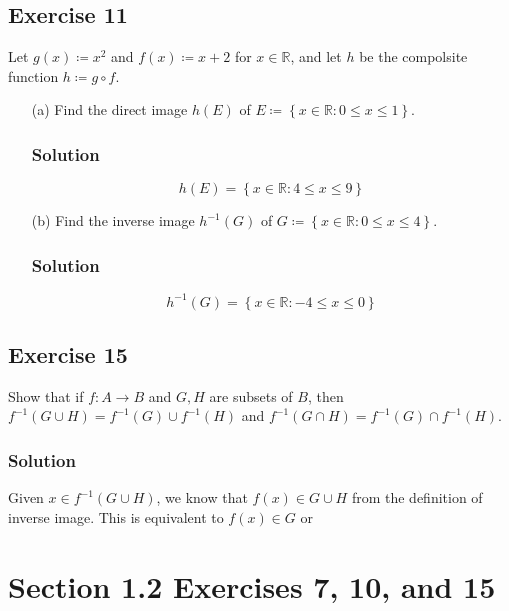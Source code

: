 \documentclass[12pt]{article}
\begin{document}
\subsection*{Exercise 11}
Let $g\left(x\right) \coloneqq x^2$  and $f\left(x\right) \coloneqq x + 2$ for $x \in \mathbb{R}$, and let $h$ be the compolsite function $h \coloneqq g \circ f$.
\begin{itemize}
\item[(a)] Find the direct image $h\left(E\right)$ of $E \coloneqq \left\{x \in \mathbb{R} : 0 \leq x \leq 1\right\}$.
\subsubsection*{Solution}
\[
h\left(E\right) = \left\{x \in \mathbb{R} : 4 \leq x \leq 9\right\}
\]
\item[(b)] Find the inverse image $h^{-1}\left(G\right)$ of $G \coloneqq \left\{x \in \mathbb{R} : 0 \leq x \leq 4\right\}$.
\subsubsection*{Solution}
\[
h^{-1}\left(G\right) = \left\{x \in \mathbb{R} : -4 \leq x \leq 0\right\}
\]
\end{itemize}

\subsection*{Exercise 15}
Show that if $f : A \to B$ and $G, H$ are subsets of $B$, then $f^{-1}\left(G \cup H\right) = f^{-1}\left(G\right) \cup f^{-1}\left(H\right)$ and $f^{-1}\left(G \cap H\right) = f^{-1}\left(G\right) \cap f^{-1}\left(H\right)$.

\subsubsection*{Solution}
Given $x \in f^{-1}\left(G \cup H\right)$, we know that $f\left(x\right) \in G \cup H$ from the definition of inverse image. This is equivalent to $f\left(x\right) \in G$ or 

\section*{Section 1.2 Exercises 7, 10, and 15}
\end{document}
